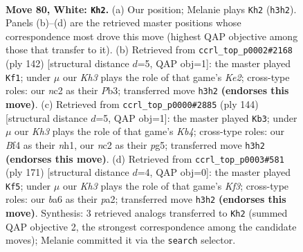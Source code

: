\documentclass[11pt]{article}
\begin{document}
\clearpage

\begin{figure}[p]\centering
\begin{subfigure}{0.46\textwidth}\centering
\resizebox{\linewidth}{!}{%
\newchessgame
\chessboard[
  setfen={7k/8/b7/8/5B2/7K/2n2P2/8 w - - 5 80},
  showmover=false,
  pgfstyle=straightmove, color=movearrow, markmove={h3-h2}
]}
\caption{}
\end{subfigure}\hfill
\begin{subfigure}{0.46\textwidth}\centering
\resizebox{\linewidth}{!}{%
\newchessgame
\chessboard[
  setfen={8/8/8/6k1/1p6/1P6/1b2K1B1/8 w - - 6 72},
  showmover=false,
  pgfstyle=straightmove, color=movearrow, markmove={e2-f1}
]}
\caption{}
\end{subfigure}
\\[4pt]
\begin{subfigure}{0.46\textwidth}\centering
\resizebox{\linewidth}{!}{%
\newchessgame
\chessboard[
  setfen={6B1/3k4/8/6p1/1K4P1/8/8/7n w - - 19 73},
  showmover=false,
  pgfstyle=straightmove, color=movearrow, markmove={b4-b3}
]}
\caption{}
\end{subfigure}\hfill
\begin{subfigure}{0.46\textwidth}\centering
\resizebox{\linewidth}{!}{%
\newchessgame
\chessboard[
  setfen={8/8/5k2/8/1K2b2p/8/P7/6N1 b - - 1 86},
  showmover=false,
  pgfstyle=straightmove, color=movearrow, markmove={f6-f5}
]}
\caption{}
\end{subfigure}
\caption{\textbf{Move 80, White: \texttt{Kh2}.} (a) Our position; Melanie plays \texttt{Kh2} (\texttt{h3h2}). Panels (b)--(d) are the retrieved master positions whose correspondence most drove this move (highest QAP objective among those that transfer to it). (b) Retrieved from \texttt{ccrl\_top\_p0002\#2168} (ply 142) [structural distance $d$=5, QAP obj=1]: the master played \texttt{Kf1}; under $\mu$ our \emph{Kh3} plays the role of that game's \emph{Ke2}; cross-type roles: our \emph{n}c2 as their \emph{P}b3; transferred move \texttt{h3h2} \textbf{(endorses this move)}. (c) Retrieved from \texttt{ccrl\_top\_p0000\#2885} (ply 144) [structural distance $d$=5, QAP obj=1]: the master played \texttt{Kb3}; under $\mu$ our \emph{Kh3} plays the role of that game's \emph{Kb4}; cross-type roles: our \emph{B}f4 as their \emph{n}h1, our \emph{n}c2 as their \emph{p}g5; transferred move \texttt{h3h2} \textbf{(endorses this move)}. (d) Retrieved from \texttt{ccrl\_top\_p0003\#581} (ply 171) [structural distance $d$=4, QAP obj=0]: the master played \texttt{Kf5}; under $\mu$ our \emph{Kh3} plays the role of that game's \emph{Kf3}; cross-type roles: our \emph{b}a6 as their \emph{p}a2; transferred move \texttt{h3h2} \textbf{(endorses this move)}. Synthesis: 3 retrieved analogs transferred to \texttt{Kh2} (summed QAP objective 2, the strongest correspondence among the candidate moves); Melanie committed it via the \texttt{search} selector.}
\label{fig:thought-m158}
\end{figure}
\end{document}
